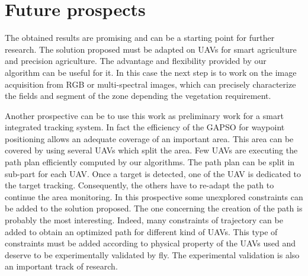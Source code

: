 \section{Future prospects}
The obtained results are promising and can be a starting point for further research. 
The solution proposed must be adapted on UAVs for smart agriculture and precision agriculture. The advantage and flexibility provided by our algorithm can be useful for it. In this case the next step is to work on the image acquisition from RGB or multi-spectral images, which can precisely characterize the fields and segment of the zone depending the vegetation requirement. %


Another prospective can be to use this work as preliminary work for a smart integrated tracking system. In	fact the efficiency of the GAPSO for waypoint positioning allows an adequate coverage of an important area. This area can be covered by using several UAVs which split the area. Few UAVs are executing the path plan efficiently computed by our algorithms. The path plan can be split in sub-part for each UAV. Once a target is detected, one of the UAV is dedicated to the target tracking. Consequently, the others have to re-adapt the path to continue the area monitoring. In this prospective some unexplored constraints can be added to the solution proposed.
The one concerning the creation of the path is probably the most interesting.  Indeed, many constraints of trajectory can be added to obtain an optimized path for different kind of UAVs. This type of constraints must be added according to physical property of the UAVs used and deserve to be experimentally validated by fly. 
The experimental validation is also an important track of research.

